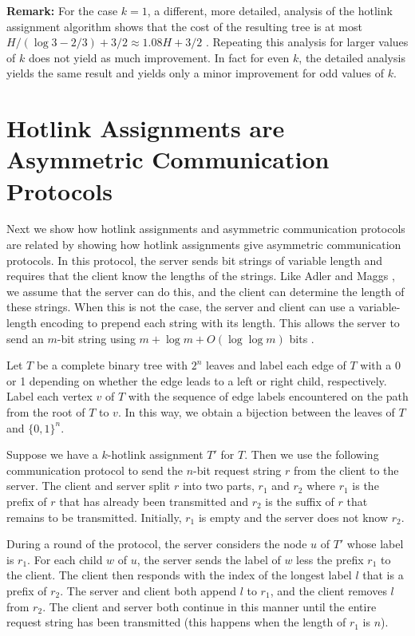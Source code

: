 \documentclass[lotsofwhite]{patmorin}
\begin{document}
\noindent\textbf{Remark:} For the case $k=1$, a different, more
detailed, analysis of the hotlink assignment algorithm shows that the
cost of the resulting tree is at most $H/(\log 3-2/3)+3/2\approx
1.08H+3/2$ \cite{kks01,lh02}.  Repeating this analysis for larger values
of $k$ does not yield as much improvement.  In fact for even $k$, the
detailed analysis yields the same result and yields only a minor
improvement for odd values of $k$.


\section{Hotlink Assignments are Asymmetric Communication Protocols}

Next we show how hotlink assignments and asymmetric communication
protocols are related by showing how hotlink assignments give
asymmetric communication protocols.  In this protocol, the server
sends bit strings of variable length and requires that the client know
the lengths of the strings.  Like Adler and Maggs \cite{am98}, we
assume that the server can do this, and the client can determine the
length of these strings.  When this is not the case, the server and
client can use a variable-length encoding to prepend each string with
its length.  This allows the server to send an $m$-bit string using
$m+\log m+O(\log\log m)$ bits \cite{e75}.

Let $T$ be a complete binary tree with $2^n$ leaves and label each
edge of $T$ with a 0 or 1 depending on whether the edge leads to a
left or right child, respectively.  Label each vertex $v$ of $T$ with
the sequence of edge labels encountered on the path from the root of
$T$ to $v$.  In this way, we obtain a bijection between the leaves of
$T$ and $\{0,1\}^n$.

Suppose we have a $k$-hotlink assignment $T'$ for $T$.  Then we use
the following communication protocol to send the $n$-bit request
string $r$ from the client to the server.  The client and server split
$r$ into two parts, $r_1$ and $r_2$ where $r_1$ is the prefix of $r$
that has already been transmitted and $r_2$ is the suffix of $r$ that
remains to be transmitted.  Initially, $r_1$ is empty and the server
does not know $r_2$.

During a round of the protocol, the server considers the node $u$ of
$T'$ whose label is $r_1$.  For each child $w$ of $u$, the server
sends the label of $w$ less the prefix $r_1$ to the client.  The
client then responds with the index of the longest label $l$ that is a
prefix of $r_2$.  The server and client both append $l$ to $r_1$, and
the client removes $l$ from $r_2$.  The client and server both
continue in this manner until the entire request string has been
transmitted (this happens when the length of $r_1$ is $n$).
\end{document}
